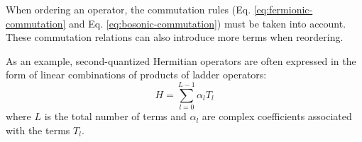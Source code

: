 When ordering an operator, the commutation rules (Eq. \ref{eq:fermionic-commutation} and Eq. \ref{eq:bosonic-commutation}) must be taken into account.
These commutation relations can also introduce more terms when reordering.

As an example, second-quantized Hermitian operators are often expressed in the form of linear combinations of products of ladder operators:
\begin{equation}
    \label{eq:lclo}
    H = \sum_{l=0}^{L-1} \alpha_l T_l
\end{equation}
where $L$ is the total number of terms and $\alpha_l$ are complex coefficients associated with the terms $T_l$.
